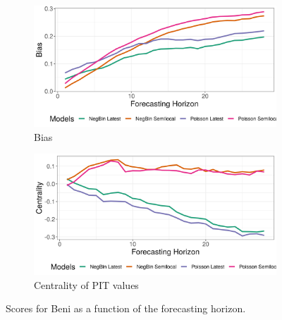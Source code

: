 \begin{figure}[H]
\begin{subfigure}{0.5\textwidth}
  \centering
  \includegraphics[width=\linewidth]{../output/Beni_bias.png}  
  \caption{Bias}
  \label{fig:Beni_scores_3}
\end{subfigure}
\begin{subfigure}{0.5\textwidth}
  \centering
  \includegraphics[width=\linewidth]{../output/Beni_centrality.png}  
  \caption{Centrality of PIT values}
  \label{fig:Beni_scores_4}
\end{subfigure}
  \caption{Scores for Beni as a function of the forecasting horizon.}

  \label{fig:nat_scores}
\end{figure}
